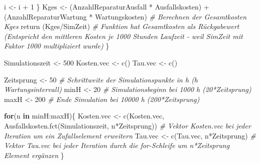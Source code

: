 \documentclass[
]{article}
\newenvironment{Shaded}{\begin{snugshade}}{\end{snugshade}}
\newcommand{\CommentTok}[1]{\textcolor[rgb]{0.56,0.35,0.01}{\textit{#1}}}
\newcommand{\ControlFlowTok}[1]{\textcolor[rgb]{0.13,0.29,0.53}{\textbf{#1}}}
\newcommand{\DecValTok}[1]{\textcolor[rgb]{0.00,0.00,0.81}{#1}}
\newcommand{\FunctionTok}[1]{\textcolor[rgb]{0.00,0.00,0.00}{#1}}
\newcommand{\NormalTok}[1]{#1}
\newcommand{\OtherTok}[1]{\textcolor[rgb]{0.56,0.35,0.01}{#1}}
\newcommand{\SpecialCharTok}[1]{\textcolor[rgb]{0.00,0.00,0.00}{#1}}
\begin{document}
\begin{Shaded}
\begin{Highlighting}[]
\NormalTok{    i }\OtherTok{\textless{}{-}}\NormalTok{ i }\SpecialCharTok{+} \DecValTok{1}
\NormalTok{  \}}
\NormalTok{  Kges }\OtherTok{\textless{}{-}}\NormalTok{ (AnzahlReparaturAusfall }\SpecialCharTok{*}\NormalTok{ Ausfallskosten) }\SpecialCharTok{+}\NormalTok{ (AnzahlReparaturWartung }\SpecialCharTok{*}\NormalTok{ Wartungskosten)           }\CommentTok{\# Berechnen der Gesamtkosten Kges}
  \FunctionTok{return}\NormalTok{ (Kges}\SpecialCharTok{/}\NormalTok{SimZeit)   }\CommentTok{\# Funktion hat Gesamtkosten als Rückgabewert (Entspricht den mittleren Kosten je 1000 Stunden Laufzeit {-} weil SimZeit mit Faktor 1000 multipliziert wurde)}
\NormalTok{\}}
\end{Highlighting}
\end{Shaded}

\begin{Shaded}
\begin{Highlighting}[]
\NormalTok{Simulationszeit }\OtherTok{\textless{}{-}} \DecValTok{500}
\NormalTok{Kosten.vec }\OtherTok{\textless{}{-}} \FunctionTok{c}\NormalTok{()}
\NormalTok{Tau.vec }\OtherTok{\textless{}{-}} \FunctionTok{c}\NormalTok{()}

\NormalTok{Zeitsprung }\OtherTok{\textless{}{-}} \DecValTok{50}    \CommentTok{\# Schrittweite der Simulationspunkte in h (h Wartungsintervall)}
\NormalTok{minH }\OtherTok{\textless{}{-}} \DecValTok{20}          \CommentTok{\# Simulationsbeginn bei 1000 h (20*Zeitsprung)}
\NormalTok{maxH }\OtherTok{\textless{}{-}} \DecValTok{200}         \CommentTok{\# Ende Simulation bei 10000 h (200*Zeitsprung)}


\ControlFlowTok{for}\NormalTok{(n }\ControlFlowTok{in}\NormalTok{ minH}\SpecialCharTok{:}\NormalTok{maxH)\{}
\NormalTok{  Kosten.vec }\OtherTok{\textless{}{-}} \FunctionTok{c}\NormalTok{(Kosten.vec, }\FunctionTok{Ausfallskosten.fct}\NormalTok{(Simulationszeit, n}\SpecialCharTok{*}\NormalTok{Zeitsprung))  }\CommentTok{\# Vektor Kosten.vec bei jeder Iteration um ein Zufallselement erweitern}
\NormalTok{  Tau.vec }\OtherTok{\textless{}{-}} \FunctionTok{c}\NormalTok{(Tau.vec, n}\SpecialCharTok{*}\NormalTok{Zeitsprung)     }\CommentTok{\# Vektor Tau.vec bei jeder Iteration durch die for{-}Schleife um n*Zeitsprung Element ergänzen}
\NormalTok{\}}


\end{Highlighting}
\end{Shaded}
\end{document}
